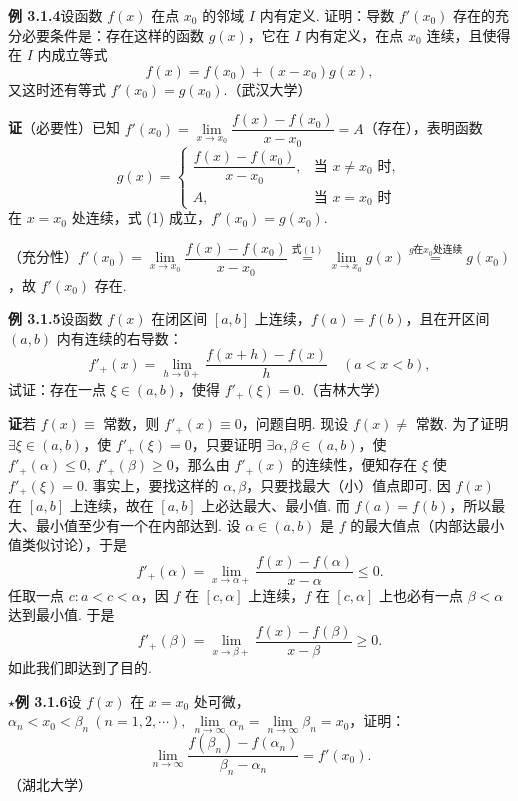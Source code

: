 \documentclass[UTF8,12pt,a4paper,fontset=fandol]{ctexart}
\begin{document}
\noindent\textbf{例 3.1.4}\quad 设函数 $f(x)$ 在点 $x_0$ 的邻域 $I$ 内有定义. 证明：导数 $f'(x_0)$ 存在的充分必要条件是：存在这样的函数 $g(x)$，它在 $I$ 内有定义，在点 $x_0$ 连续，且使得在 $I$ 内成立等式
\begin{equation}
  f(x)=f(x_0)+(x-x_0)g(x),
\tag{1}
\end{equation}
又这时还有等式 $f'(x_0)=g(x_0)$.（武汉大学）

\noindent\textbf{证}\quad （必要性）已知 $f'(x_0)=\lim\limits_{x\to x_0}\dfrac{f(x)-f(x_0)}{x-x_0}=A$（存在），表明函数
\[
g(x)=
\begin{cases}
\dfrac{f(x)-f(x_0)}{x-x_0}, & \text{当 }x\ne x_0\text{ 时},\\
A, & \text{当 }x=x_0\text{ 时}
\end{cases}
\]
在 $x=x_0$ 处连续，式 (1) 成立，$f'(x_0)=g(x_0)$.

（充分性）$f'(x_0)=\lim\limits_{x\to x_0}\dfrac{f(x)-f(x_0)}{x-x_0}\stackrel{\text{式}(1)}{=}\lim\limits_{x\to x_0}g(x)\stackrel{g\text{在}x_0\text{处连续}}{=}g(x_0)$，故 $f'(x_0)$ 存在.

\noindent\textbf{例 3.1.5}\quad 设函数 $f(x)$ 在闭区间 $[a,b]$ 上连续，$f(a)=f(b)$，且在开区间 $(a,b)$ 内有连续的右导数：
\[
  f'_+(x)=\lim_{h\to0+}\frac{f(x+h)-f(x)}h\quad(a<x<b),
\]
试证：存在一点 $\xi\in(a,b)$，使得 $f'_+(\xi)=0$.（吉林大学）

\noindent\textbf{证}\quad 若 $f(x)\equiv$ 常数，则 $f'_+(x)\equiv0$，问题自明. 现设 $f(x)\ne$ 常数. 为了证明 $\exists \xi\in(a,b)$，使 $f'_+(\xi)=0$，只要证明 $\exists \alpha,\beta\in(a,b)$，使 $f'_+(\alpha)\le0,\ f'_+(\beta)\ge0$，那么由 $f'_+(x)$ 的连续性，便知存在 $\xi$ 使 $f'_+(\xi)=0$. 事实上，要找这样的 $\alpha,\beta$，只要找最大（小）值点即可. 因 $f(x)$ 在 $[a,b]$ 上连续，故在 $[a,b]$ 上必达最大、最小值. 而 $f(a)=f(b)$，所以最大、最小值至少有一个在内部达到. 设 $\alpha\in(a,b)$ 是 $f$ 的最大值点（内部达最小值类似讨论），于是
\[
  f'_+(\alpha)=\lim_{x\to\alpha+}\frac{f(x)-f(\alpha)}{x-\alpha}\le0.
\]
任取一点 $c:a<c<\alpha$，因 $f$ 在 $[c,\alpha]$ 上连续，$f$ 在 $[c,\alpha]$ 上也必有一点 $\beta<\alpha$ 达到最小值. 于是
\[
  f'_+(\beta)=\lim_{x\to\beta+}\frac{f(x)-f(\beta)}{x-\beta}\ge0.
\]
如此我们即达到了目的.

\noindent\textbf{$\star$例 3.1.6}\quad 设 $f(x)$ 在 $x=x_0$ 处可微，$\alpha_n<x_0<\beta_n\ (n=1,2,\cdots),\ \lim\limits_{n\to\infty}\alpha_n=\lim\limits_{n\to\infty}\beta_n=x_0$，证明：
\[
  \lim_{n\to\infty}\frac{f(\beta_n)-f(\alpha_n)}{\beta_n-\alpha_n}=f'(x_0).
\]
（湖北大学）
\end{document}
